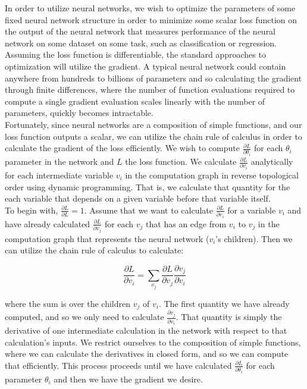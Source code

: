 \documentclass{article}
\begin{document}
In order to utilize neural networks, we wish to optimize the parameters of some fixed neural network structure in order to minimize some scalar loss function on the output of the neural network that measures
performance of the neural network on some dataset on some task, such as classification or regression.
Assuming the loss function is differentiable, the standard approaches to optimization will utilize the gradient.
A typical neural network could contain anywhere from hundreds to billions of parameters and so calculating the gradient through finite differences, where the number of function evaluations
required to compute a single gradient evaluation scales linearly with the number of parameters, quickly becomes intractable.
\\

Fortunately, since neural networks are a composition of simple functions, and our loss function outputs a scalar, we can utilize the chain rule of calculus in order to calculate the gradient of the loss efficiently.
We wish to compute $\frac{\partial L}{\partial \theta_i}$ for each $\theta_i$ parameter in the network and $L$ the loss function.
We calculate $\frac{\partial L}{\partial v_i}$ analytically for each intermediate variable $v_i$ in the computation graph in reverse topological order using dynamic programming.
That is, we calculate that quantity for the each variable that depends on a given variable before that variable itself.
\\

To begin with, $\frac{\partial L}{\partial L} = 1$.
Assume that we want to calculate $\frac{\partial L}{\partial v_i}$ for a variable $v_i$ and have already calculated $\frac{\partial L}{\partial v_j}$ for each $v_j$
that has an edge from $v_i$ to $v_j$ in the computation graph that represents the neural network ($v_i$'s children).
Then we can utilize the chain rule of calculus to calculate:

\[
    \frac{\partial L}{\partial v_i} = \sum_{v_j} \frac{\partial L}{\partial v_j} \frac{\partial v_j}{\partial v_i}
\]

where the sum is over the children $v_j$ of $v_i$.
The first quantity we have already computed, and so we only need to calculate $\frac{\partial v_j}{\partial v_i}$.
That quantity is simply the derivative of one intermediate calculation in the network with respect to that calculation's inputs.
We restrict ourselves to the composition of simple functions, where we can calculate the derivatives in closed form, and so we can compute that efficiently.
This process proceeds until we have calculated $\frac{\partial L}{\partial \theta_i}$ for each parameter $\theta_i$ and then we have the gradient we desire.
\end{document}
